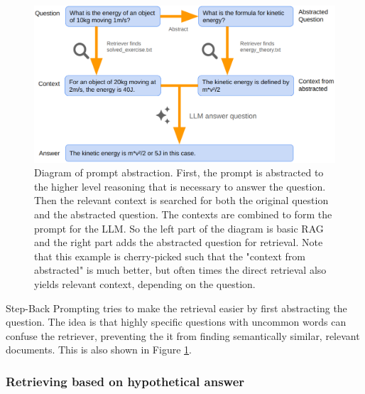 \begin{figure}[h]
	\centering
	\includegraphics[width=0.9\linewidth]{fig/rag_abstract_prompt.png}
	\caption{Diagram of prompt abstraction. First, the prompt is abstracted to the higher level reasoning that is necessary to answer the question. Then the relevant context is searched for both the original question and the abstracted question. The contexts are combined to form the prompt for the LLM. So the left part of the diagram is basic RAG and the right part adds the abstracted question for retrieval. Note that this example is cherry-picked such that the "context from abstracted" is much better, but often times the direct retrieval also yields relevant context, depending on the question.}
	\label{fig:rag_abstract_prompt}
\end{figure}

Step-Back Prompting \cite{zheng2023takeastepback} tries to make the retrieval easier by first abstracting the question. The idea is that highly specific questions with uncommon words can confuse the retriever, preventing the it from finding semantically similar, relevant documents. This is also shown in Figure \ref{fig:rag_abstract_prompt}.

\subsubsection{Retrieving based on hypothetical answer}

